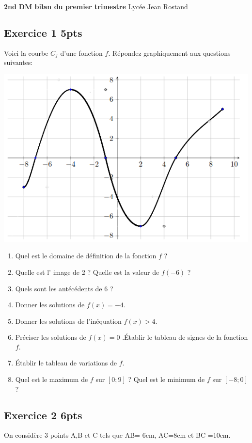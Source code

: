 \documentclass[12pt,a4paper]{article}
\begin{document}
\textbf{2nd} \hfill \textbf{DM bilan du premier trimestre} \hfill Lycée Jean Rostand\\
\trait 
\subsection*{Exercice 1 \hfill 5pts}
Voici la courbe $C_f$ d'une fonction $f$. Répondez graphiquement aux questions suivantes:

\begin{center}
\includegraphics[scale=0.7
]{courbe.png}
\end{center}


\begin{enumerate}
\item Quel est le domaine de définition de la fonction $f$ ?
\item Quelle est l' image de 2 ? Quelle est la valeur de $f(-6)$  ?
\item Quels sont les antécédents de $6$ ?
\item Donner les solutions de $f(x)=-4$.
\item Donner les solutions de l'inéquation $f(x)>4$.
\item Préciser les solutions de $f(x)=0$ .Établir le tableau de signes de la fonction $f$.
\item Établir le tableau de variations de $f$.
\item Quel est le maximum de $f$ sur $[0;9]$ ? Quel est le minimum de $f$ sur $[-8;0]$ ?


\end{enumerate}

\subsection*{Exercice 2 \hfill 6pts}
On considère 3 points A,B et C tels que AB= 6cm, AC=8cm et BC =10cm.
\end{document}
